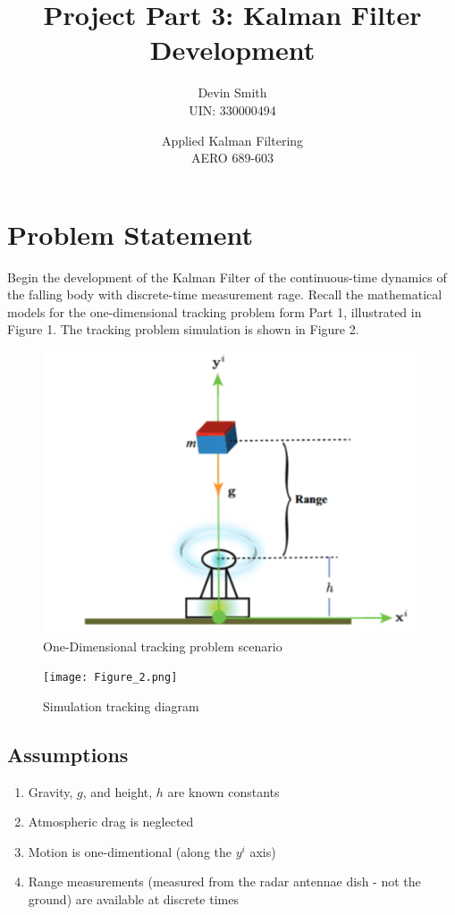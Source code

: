 \documentclass{article}
\title{Project Part 3: Kalman Filter Development}
\author{Devin Smith \\ UIN: 330000494}
\date{Applied Kalman Filtering\\AERO 689-603}
\begin{document}
\maketitle

\section{Problem Statement}
Begin the development of the Kalman Filter of the continuous-time dynamics of the falling body with discrete-time measurement rage. Recall the mathematical models for the one-dimensional tracking problem form Part 1, illustrated in Figure 1. The tracking problem simulation is shown in Figure 2.

\begin{figure}[h]
    \centering
    \includegraphics[width=1\linewidth]{Figure_1.png}
    \caption{One-Dimensional tracking problem scenario}
    \label{fig:enter-label}
\end{figure}

\begin{figure}[h]
    \centering
    \texttt{[image: Figure\_2.png]}
    \caption{Simulation tracking diagram}
    \label{fig:enter-label}
\end{figure}

\subsection{Assumptions}

\begin{enumerate}
    \item Gravity, \textbf{$g$}, and height, \textit{$h$} are known constants
    \item Atmospheric drag is neglected
    \item Motion is one-dimentional (along the \textbf{$y^i$} axis)
    \item Range measurements (measured from the radar antennae dish - not the ground) are available at discrete times
\end{enumerate}
\end{document}
